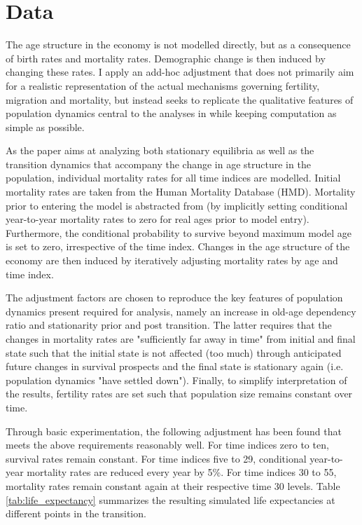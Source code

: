 \section{Data}
\label{sec:data}

The age structure in the economy is not modelled directly, but as a consequence of birth rates and mortality rates. Demographic change is then induced by changing these rates. I apply an add-hoc adjustment that does not primarily aim for a realistic representation of the actual mechanisms governing fertility, migration and mortality, but instead seeks to replicate the qualitative features of population dynamics central to the analyses in \cite{LudwigSchelkleVogel2012} while keeping computation as simple as possible.

As the paper aims at analyzing both stationary equilibria as well as the transition dynamics that accompany the change in age structure in the population, individual mortality rates for all time indices are modelled. Initial mortality rates are taken from the Human Mortality Database (HMD). Mortality prior to entering the model is abstracted from (by implicitly setting conditional year-to-year mortality rates to zero for real ages prior to model entry). Furthermore, the conditional probability to survive beyond maximum model age is set to zero, irrespective of the time index. Changes in the age structure of the economy are then induced by iteratively adjusting mortality rates by age and time index.

The adjustment factors are chosen to reproduce the key features of population dynamics present required for analysis, namely an increase in old-age dependency ratio and stationarity prior and post transition. The latter requires that the changes in mortality rates are "sufficiently far away in time" from initial and final state such that the initial state is not affected (too much) through anticipated future changes in survival prospects and the final state is stationary again (i.e. population dynamics "have settled down"). Finally, to simplify interpretation of the results, fertility rates are set such that population size remains constant over time.

Through basic experimentation, the following adjustment has been found that meets the above requirements reasonably well. For time indices zero to ten, survival rates remain constant. For time indices five to 29, conditional year-to-year mortality rates are reduced every year by 5\%. For time indices 30 to 55, mortality rates remain constant again at their respective time 30 levels. Table \ref{tab:life_expectancy} summarizes the resulting simulated life expectancies at different points in the transition.

